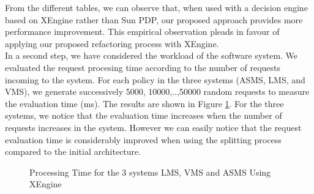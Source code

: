 From the different tables, we can observe that, when used with a decision engine based on XEngine rather than Sun PDP, our proposed approach provides more performance improvement. 
This empirical observation pleads in favour of applying our proposed refactoring process with XEngine.\\

In a second step, we have considered the workload of the software system. We evaluated the request procesing time according to the number of requests incoming to the system. 
For each policy in the three systems (ASMS, LMS, and VMS), we generate successively 5000, 10000,..,50000 random requests to measure the evaluation time (ms).
The results are shown in Figure \ref{fig:processing time1}. For the three systems, we notice that the evaluation time increases when the number of requests increases in the system. 
However we can easily notice that the request evaluation time is considerably improved when using the splitting process compared to the initial architecture.

\begin{figure}
  \centering
  \caption{Processing Time for the 3 systems LMS, VMS and ASMS Using XEngine}
  \label{fig:processing time1}
\end{figure}


